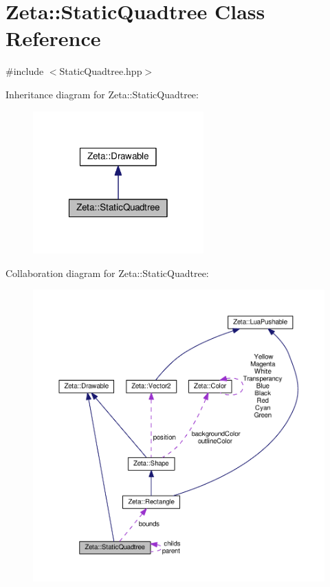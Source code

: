 \hypertarget{classZeta_1_1StaticQuadtree}{\section{Zeta\+:\+:Static\+Quadtree Class Reference}
\label{classZeta_1_1StaticQuadtree}
}


{\ttfamily \#include $<$Static\+Quadtree.\+hpp$>$}



Inheritance diagram for Zeta\+:\+:Static\+Quadtree\+:\nopagebreak
\begin{figure}[H]
\begin{center}
\leavevmode
\includegraphics[width=186pt]{classZeta_1_1StaticQuadtree__inherit__graph}
\end{center}
\end{figure}


Collaboration diagram for Zeta\+:\+:Static\+Quadtree\+:\nopagebreak
\begin{figure}[H]
\begin{center}
\leavevmode
\includegraphics[width=350pt]{classZeta_1_1StaticQuadtree__coll__graph}
\end{center}
\end{figure}
